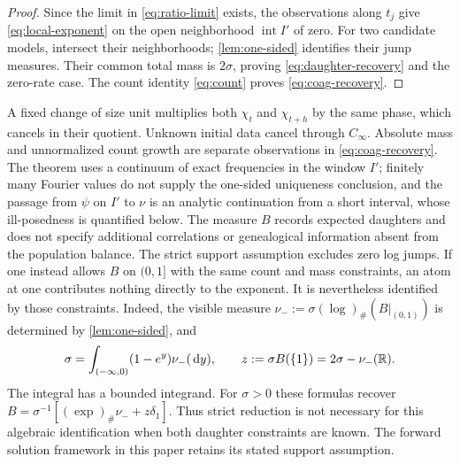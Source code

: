 \begin{proof}
Since the limit in \eqref{eq:ratio-limit} exists, the observations along
$t_j$ give \eqref{eq:local-exponent} on the open neighborhood
$\operatorname{int}I'$ of zero. For two candidate models, intersect
their neighborhoods;
\cref{lem:one-sided} identifies their jump measures. Their common total
mass is $2\sigma$, proving \eqref{eq:daughter-recovery} and the zero-rate
case. The count identity \eqref{eq:count} proves
\eqref{eq:coag-recovery}.
\end{proof}

A fixed change of size unit multiplies both $\chi_t$ and $\chi_{t+h}$ by
the same phase, which cancels in their quotient. Unknown initial data
cancel through $C_\infty$. Absolute mass and unnormalized count growth
are separate observations in \eqref{eq:coag-recovery}. The theorem uses
a continuum of exact frequencies in the window $I'$; finitely many
Fourier values do not supply the one-sided uniqueness conclusion, and
the passage from $\psi$ on $I'$ to $\nu$ is an analytic continuation from
a short interval, whose ill-posedness is quantified below. The measure $B$
records expected daughters and does not specify additional correlations
or genealogical information absent from the population balance.
The strict support assumption excludes zero log jumps. If one instead
allows $B$ on $(0,1]$ with the same count and mass constraints, an atom
at one contributes nothing directly to the exponent. It is nevertheless
identified by those constraints. Indeed, the visible measure
$\nu_-:=\sigma(\log)_\#(B|_{(0,1)})$ is determined by
\cref{lem:one-sided}, and
\[
 \sigma=\int_{(-\infty,0)}(1-e^y)\nu_-(\,\mathrm d y),\qquad
 z:=\sigma B(\{1\})=2\sigma-\nu_-(\mathbb R).
\]
The integral has a bounded integrand. For $\sigma>0$ these formulas
recover $B=\sigma^{-1}[(\exp)_\#\nu_-+z\delta_1]$.
Thus strict reduction is not necessary for this algebraic identification
when both daughter constraints are known. The forward solution framework
in this paper retains its stated support assumption.

